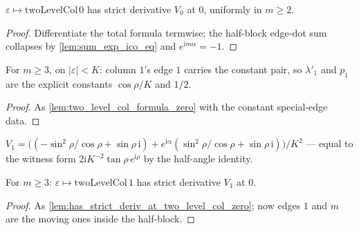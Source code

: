 \begin{lemma}\leanok
[column-0 derivative $C_0'(0) = V_0$]
  \label{lem:has_strict_deriv_at_two_level_col_zero}
  $\varepsilon \mapsto \mathrm{twoLevelCol}\,0$ has strict derivative $V_0$
  at $0$, uniformly in $m \ge 2$.
\end{lemma}
\begin{proof}

\leanok
  Differentiate the total formula termwise; the half-block edge-dot sum
  collapses by \cref{lem:sum_exp_ico_eq} and $e^{\mathrm{i}m\alpha} = -1$.
\end{proof}

\begin{lemma}
  \label{lem:two_level_col_formula_one}
  For $m \ge 3$, on $|\varepsilon| < K$: column $1$'s edge $1$ carries the
  constant pair, so $\lambda'_1$ and $p_1$ are the explicit constants
  $\cos\rho/K$ and $1/2$.
\end{lemma}
\begin{proof}

\leanok
  As \cref{lem:two_level_col_formula_zero} with the constant special-edge
  data.
\end{proof}

\begin{definition}
  \label{def:two_level_v_one}
  $V_1 = \bigl((-\sin^2\rho/\cos\rho + \sin\rho\,\mathrm{i}) +
  e^{\mathrm{i}\alpha}(\sin^2\rho/\cos\rho + \sin\rho\,\mathrm{i})\bigr)/K^2$
  --- equal to the witness form $2\mathrm{i}K^{-2}\tan\rho\,e^{\mathrm{i}\rho}$
  by the half-angle identity.
\end{definition}

\begin{lemma}\leanok
[column-1 derivative $C_1'(0) = V_1$, interior case]
  \label{lem:has_strict_deriv_at_two_level_col_one}
  For $m \ge 3$: $\varepsilon \mapsto \mathrm{twoLevelCol}\,1$ has strict
  derivative $V_1$ at $0$.
\end{lemma}
\begin{proof}

\leanok
  As \cref{lem:has_strict_deriv_at_two_level_col_zero}; now edges $1$ and $m$
  are the moving ones inside the half-block.
\end{proof}

